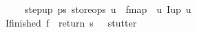 \begin{isabellebody}
\ \ \ \ {\isacharbar}\ {\isacharunderscore}\ {\isasymRightarrow}\ {\isacharparenleft}step{\isacharunderscore}up\ ps{}\ store{\isacharunderscore}ops\ u\ {\isacharbar}{\isachargreater}\ fmap\ {\isacharparenleft}{\isacharpercent}\ u{\isachardot}\ I{\isacharunderscore}up\ u{\isacharparenright}{\isacharparenright}{\isacharparenright}\isanewline
\ \ {\isacharbar}\ I{\isacharunderscore}finished\ f\ {\isasymRightarrow}\ {\isacharparenleft}return\ s{\isacharparenright}\ \ {\isacharparenleft}{\isacharasterisk}\ stutter\ {\isacharasterisk}{\isacharparenright}\ {\isacharparenright}{\isachardoublequoteclose}\isanewline
\isanewline
\isanewline
%
\isadelimtheory
\isanewline
%
\endisadelimtheory
%
\isatagtheory
{}\isamarkupfalse%
%
\endisatagtheory
{\isafoldtheory}%
%
\isadelimtheory
%
\endisadelimtheory
\end{isabellebody}%
